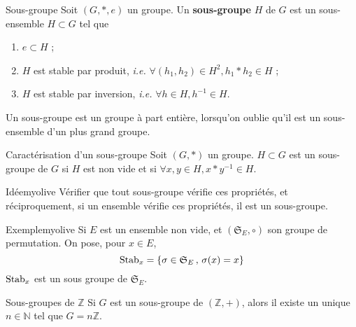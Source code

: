     \begin{defi}{Sous-groupe}{}
        Soit $(G,*,e)$ un groupe. Un \textbf{sous-groupe} $H$ de $G$ est un sous-ensemble $H \subset G$ tel que 
        \begin{enumerate}[label = \arabic*.]
            \item $e \subset H$ ;
            \item $H$ est stable par produit, \textit{i.e.} $\forall (h_1, h_2) \in H^2, h_1 * h_2 \in H$ ;
            \item $H$ est stable par inversion, \textit{i.e.} $\forall h \in H, h^{-1} \in H$.
        \end{enumerate}
        Un sous-groupe est un groupe à part entière, lorsqu’on oublie qu’il est un sous-ensemble d’un plus grand groupe.
    \end{defi}

    \begin{prop}{Caractérisation d’un sous-groupe}{}
        Soit $(G,*)$ un groupe. $H \subset G$ est un sous-groupe de $G$ si $H$ est non vide et si $\forall x,y \in H, x * y^{-1} \in H$.
    \end{prop}

    \begin{demo}{Idée}{myolive}
        Vérifier que tout sous-groupe vérifie ces propriétés, et réciproquement, si un ensemble vérifie ces propriétés, il est un sous-groupe.
    \end{demo}

    \begin{omed}{Exemple}{myolive}
        Si $E$ est un ensemble non vide, et $(\mathfrak{S}_E, \circ)$ son groupe de permutation. On pose, pour $x \in E$, 
        \[ \operatorname{Stab}_{x} = \left\{ \sigma \in \mathfrak{S}_E \, , \, \sigma(x) = x \right\} \]   
        $\operatorname{Stab}_x$ est un sous groupe de $\mathfrak{S}_E$.
    \end{omed}

    \begin{theo}{Sous-groupes de $\mathbb{Z}$}{}
        Si $G$ est un sous-groupe de $(\mathbb{Z},+)$, alors il existe un unique $n \in \mathbb{N}$ tel que $G = n \mathbb{Z}$.
    \end{theo}


